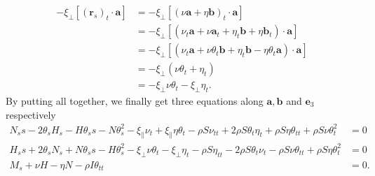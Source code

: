 \begin{equation}
\begin{split}
-\xi_{\perp}\left[(\mathbf{r}_s)_t\cdot\mathbf{a}\right] &= -\xi_{\perp}\left[(\nu\mathbf{a} + \eta\mathbf{b})_t\cdot\mathbf{a}\right]\\
&= -\xi_{\perp}\left[(\nu_t\mathbf{a} +\nu\mathbf{a}_t + \eta_t\mathbf{b} + \eta\mathbf{b}_t)\cdot\mathbf{a}\right]\\
&= -\xi_{\perp}\left[(\nu_t\mathbf{a} +\nu\theta_t\mathbf{b} + \eta_t\mathbf{b} - \eta\theta_t\mathbf{a})\cdot\mathbf{a}\right]\\
&= -\xi_{\perp}(\nu\theta_t + \eta_t)\\
&= -\xi_{\perp}\nu\theta_t - \xi_{\perp}\eta_t.
\end{split}
\end{equation}
By putting all together, we finally get three equations along $\mathbf{a},\mathbf{b}$ and $\mathbf{e}_3$ respectively
\begin{align}
N_ss - 2\theta_sH_s - H\theta_ss- N\theta_s^2 
- \xi_{\parallel}\nu_t + \xi_{\parallel}\eta\theta_t
- \rho S \nu_{tt} + 2\rho S \theta_t\eta_t + \rho S \eta\theta_{tt} + \rho S \nu\theta_t^2 &= 0\\
H_ss + 2\theta_sN_s + N\theta_ss - H\theta_s^2 
- \xi_{\perp}\nu\theta_t - \xi_{\perp}\eta_t
- \rho S \eta_{tt} - 2\rho S \theta_t\nu_t -\rho S \nu\theta_{tt} + \rho S \eta\theta_t^2  &= 0\\
M_s + \nu H -\eta N   -\rho I \theta_{tt}
                              &=0.
\end{align}





 
  
  
  
  
  
  
  
  
  
  
  
  
  
  
  
  
  
  
  
  
  
  
  
  
  
  
  
  
  
  
  
  
  
  
  
  
  
  
  
  
  
  